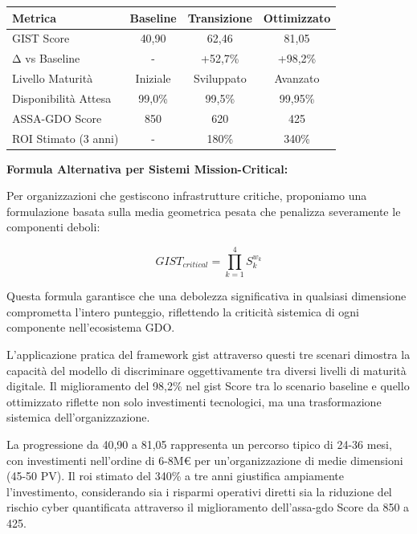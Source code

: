 \begin{tcolorbox}[
    colback=gray!5!white,
    colframe=gray!75!black,
    title={\textbf{Analisi Comparativa:} Evoluzione della Maturità Digitale},
    fonttitle=\bfseries,
    boxrule=1.5pt,
    arc=2mm,
    breakable,
    width=\textwidth
]

\begin{center}
\begin{tabularx}{\textwidth}{l c c c}
\toprule
\textbf{Metrica} & \textbf{Baseline} & \textbf{Transizione} & \textbf{Ottimizzato} \\
\midrule
GIST Score & 40,90 & 62,46 & 81,05 \\
Δ vs Baseline & - & +52,7\% & +98,2\% \\
Livello Maturità & Iniziale & Sviluppato & Avanzato \\
Disponibilità Attesa & 99,0\% & 99,5\% & 99,95\% \\
ASSA-GDO Score & 850 & 620 & 425 \\
ROI Stimato (3 anni) & - & 180\% & 340\% \\
\bottomrule
\end{tabularx}
\end{center}

\vspace{0.3cm}
\textbf{Formula Alternativa per Sistemi Mission-Critical:}

Per organizzazioni che gestiscono infrastrutture critiche, proponiamo una formulazione basata sulla media geometrica pesata che penalizza severamente le componenti deboli:

$$GIST_{critical} = \prod_{k=1}^{4} S_k^{w_k}$$

Questa formula garantisce che una debolezza significativa in qualsiasi dimensione comprometta l'intero punteggio, riflettendo la criticità sistemica di ogni componente nell'ecosistema GDO.

\end{tcolorbox}

L'applicazione pratica del framework \gls{gist} attraverso questi tre scenari dimostra la capacità del modello di discriminare oggettivamente tra diversi livelli di maturità digitale. Il miglioramento del 98,2\% nel \gls{gist} Score tra lo scenario baseline e quello ottimizzato riflette non solo investimenti tecnologici, ma una trasformazione sistemica dell'organizzazione.

La progressione da 40,90 a 81,05 rappresenta un percorso tipico di 24-36 mesi, con investimenti nell'ordine di 6-8M€ per un'organizzazione di medie dimensioni (45-50 PV). Il \gls{roi} stimato del 340\% a tre anni giustifica ampiamente l'investimento, considerando sia i risparmi operativi diretti sia la riduzione del rischio cyber quantificata attraverso il miglioramento dell'\gls{assa-gdo} Score da 850 a 425.


